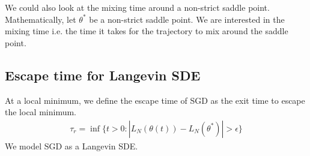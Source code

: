 \documentclass[11pt]{article}
\begin{document}
We could also look at the mixing time around a non-strict saddle point. Mathematically, let $\theta^*$ be a non-strict saddle point. We are interested in the mixing time i.e. the time it takes for the trajectory to mix around the saddle point.

\subsection{Escape time for Langevin SDE}
At a local minimum, we define the escape time of SGD as the exit time to escape the local minimum.
\begin{align}
    \tau_r = \inf\{t > 0: |L_N(\theta(t)) - L_N(\theta^*)| > \epsilon\}
\end{align}
We model SGD as a Langevin SDE. 
\end{document}

